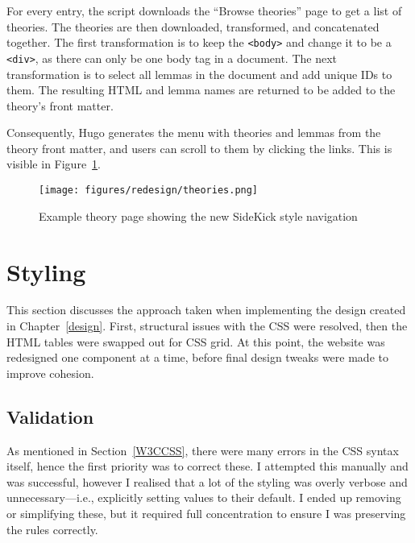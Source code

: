 \documentclass[bsc,frontabs,oneside,singlespacing,parskip,deptreport,logo]{infthesis}
\begin{document}

For every entry, the script downloads the ``Browse theories'' page to get a list of theories. The theories are then downloaded, transformed, and concatenated together. The first transformation is to keep the \verb|<body>| and change it to be a \verb|<div>|, as there can only be one body tag in a document. The next transformation is to select all lemmas in the document and add unique IDs to them. The resulting HTML and lemma names are returned to be added to the theory's front matter.

Consequently, Hugo generates the menu with theories and lemmas from the theory front matter, and users can scroll to them by clicking the links. This is visible in Figure~\ref{fig:theory-redesign}.

\begin{figure}[h]
    \centering
    \texttt{[image: figures/redesign/theories.png]}
    \caption{Example theory page showing the new SideKick style navigation}
    \label{fig:theory-redesign}
\end{figure}

\cbend
\section{Styling}
\cbstart
This section discusses the approach taken when implementing the design created in Chapter~\ref{design}. First, structural issues with the CSS were resolved, then the HTML tables were swapped out for CSS grid. At this point, the website was redesigned one component at a time, before final design tweaks were made to improve cohesion. 

\cbend
\subsection{Validation}


As mentioned in Section~\ref{W3CCSS}, there were many errors in the CSS syntax itself, hence the first priority was to correct these. I attempted this manually and was successful, however I realised that a lot of the styling was overly verbose and unnecessary---i.e., explicitly setting values to their default. I ended up removing or simplifying these, but it required full concentration to ensure I was preserving the rules correctly. 
\end{document}
